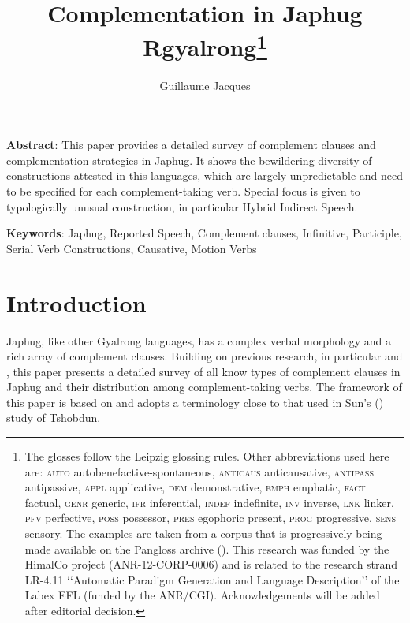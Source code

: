 \documentclass[oneside,a4paper,11pt]{article}
\begin{document}
 

\title{Complementation in Japhug Rgyalrong\footnote{The glosses follow the Leipzig glossing rules. Other abbreviations used here are: \textsc{auto}  autobenefactive-spontaneous, \textsc{anticaus} anticausative, \textsc{antipass} antipassive, \textsc{appl} applicative, \textsc{dem} demonstrative,  \textsc{emph} emphatic, \textsc{fact} factual, \textsc{genr} generic, \textsc{ifr} inferential, \textsc{indef} indefinite, \textsc{inv} inverse,  \textsc{lnk} linker, \textsc{pfv} perfective, \textsc{poss} possessor, \textsc{pres} egophoric present, \textsc{prog} progressive, \textsc{sens} sensory. The examples are taken from a corpus that is progressively being made available on the Pangloss archive (\citealt{michailovsky14pangloss}). This research was funded by the HimalCo project (ANR-12-CORP-0006) and is related to the research strand LR-4.11 ‘‘Automatic Paradigm Generation and Language Description’’ of the Labex EFL (funded by the ANR/CGI). Acknowledgements   will be added after editorial decision.}} 
\author{Guillaume Jacques}
\maketitle
\linenumbers

\textbf{Abstract}: This paper provides a detailed survey of complement clauses and complementation strategies in Japhug. It shows the bewildering diversity of constructions attested in this languages, which are largely unpredictable and need to be specified for each complement-taking verb. Special focus is given to typologically unusual construction, in particular Hybrid Indirect Speech.

\textbf{Keywords}: Japhug, Reported Speech, Complement clauses, Infinitive, Participle, Serial Verb Constructions, Causative, Motion Verbs

\section{Introduction}
Japhug, like other Gyalrong languages, has a complex verbal morphology and a rich array of complement clauses. Building on previous research, in particular  \citet[337-356]{jacques08} and \citet{sun12complementation}, this paper presents a detailed survey of all know types of complement clauses in Japhug and their distribution among complement-taking verbs. The framework of this paper is based on  \citet[9]{dixon06complementation} and adopts a terminology close to that used in Sun's (\citeyear{sun12complementation}) study of Tshobdun.
\end{document}
